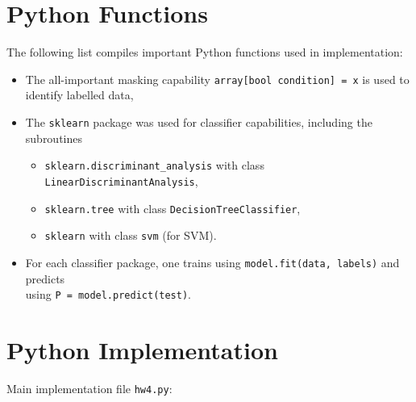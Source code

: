 \documentclass{article}
\begin{document}
\begin{appendices}

\section{Python Functions}\label{functions}
The following list compiles important Python functions used in implementation:
\begin{itemize}
\item The all-important masking capability \texttt{array[bool condition] = x} is used to identify labelled data,
\item The \texttt{sklearn} package was used for classifier capabilities, including the subroutines
  \begin{itemize}
  \item \texttt{sklearn.discriminant\_analysis} with class \texttt{LinearDiscriminantAnalysis},
  \item \texttt{sklearn.tree} with class \texttt{DecisionTreeClassifier},
  \item \texttt{sklearn} with class \texttt{svm} (for SVM).
  \end{itemize}
\item For each classifier package, one trains using \texttt{model.fit(data, labels)} and predicts\\ using \texttt{P = model.predict(test)}.
\end{itemize}

\section{Python Implementation}\label{implementation}
% 
Main implementation file \texttt{hw4.py}:


\end{appendices}
\end{document}
